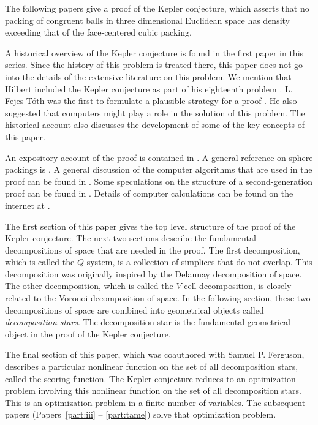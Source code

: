 
The following papers give a proof of the Kepler conjecture, which
asserts that no packing of congruent balls in three dimensional
Euclidean space has density exceeding that of the face-centered
cubic packing.


A historical overview of the Kepler conjecture is found in the first
paper in this series. Since the history of this problem is treated
there, this paper does not go into the details of the extensive
literature on this problem. We mention that Hilbert included the
Kepler conjecture as part of his eighteenth problem \cite{hilbert}.
L. Fejes T\'oth was the first to formulate a plausible strategy for
a proof \cite{FT}. He also suggested that computers might play a
role in the solution of this problem.  The historical account also
discusses the development of some of the key concepts of this paper.

An expository account of the proof is contained in \cite{CH}.  A
general reference on sphere packings is \cite{CS}.  A general
discussion of the computer algorithms that are used in the proof can
be found in \cite{algorithm}.  Some speculations on the structure of
a second-generation proof can be found in \cite{arbeitstagung}.
Details of computer calculations can be found on the internet at
\cite{web}.

The first section of this paper gives the top level structure of the
proof of the Kepler conjecture.  The next two sections describe the
fundamental decompositions of space that are needed in the proof.
The first decomposition, which is called the $Q$-system, is a
collection of simplices that do not overlap. This decomposition was
originally inspired by the Delaunay decomposition of space.  The
other decomposition, which is called the $V$-cell decomposition, is
closely related to the Voronoi decomposition of space.  In the
following section, these two decompositions of space are combined
into geometrical objects called {\it decomposition stars}. The
decomposition star is the fundamental geometrical object in the
proof of the Kepler conjecture.

The final section of this paper, which was coauthored with Samuel P.
Ferguson, describes a particular nonlinear function  on the set of
all decomposition stars, called the scoring function.  The Kepler
conjecture reduces to an optimization problem involving this
nonlinear function on the set of all decomposition stars. This is an
optimization problem in a finite number of variables. The subsequent
papers (Papers~\ref{part:iii} -- \ref{part:tame}) solve that
optimization problem.

